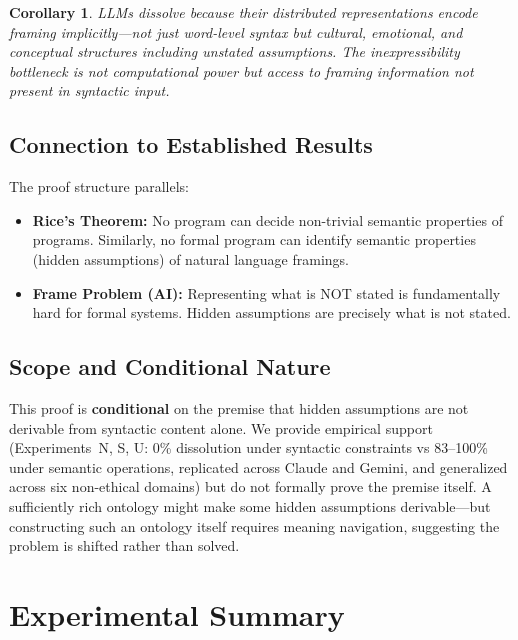\documentclass[11pt,a4paper]{article}
\newtheorem{corollary}{Corollary}
\begin{document}
\begin{corollary}
LLMs dissolve because their distributed representations encode framing implicitly---not just word-level syntax but cultural, emotional, and conceptual structures including unstated assumptions. The inexpressibility bottleneck is not computational power but \emph{access to framing information not present in syntactic input}.
\end{corollary}

\subsection{Connection to Established Results}

The proof structure parallels:
\begin{itemize}
\item \textbf{Rice's Theorem:} No program can decide non-trivial semantic properties of programs. Similarly, no formal program can identify semantic properties (hidden assumptions) of natural language framings.
\item \textbf{Frame Problem (AI):} Representing what is NOT stated is fundamentally hard for formal systems. Hidden assumptions are precisely what is not stated.
\end{itemize}

\subsection{Scope and Conditional Nature}

This proof is \textbf{conditional} on the premise that hidden assumptions are not derivable from syntactic content alone. We provide empirical support (Experiments~N, S, U: 0\% dissolution under syntactic constraints vs 83--100\% under semantic operations, replicated across Claude and Gemini, and generalized across six non-ethical domains) but do not formally prove the premise itself. A sufficiently rich ontology might make some hidden assumptions derivable---but constructing such an ontology itself requires meaning navigation, suggesting the problem is shifted rather than solved.

\section{Experimental Summary}
\end{document}
